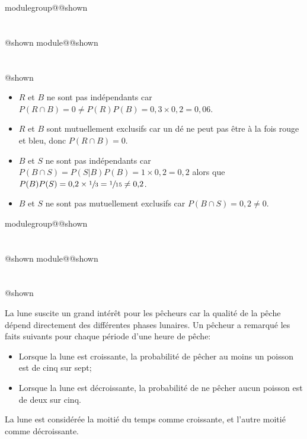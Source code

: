 \documentclass{Evaluation}
\makeatletter
\newcommand{\currentmodulekey}{}
\newcommand{\currentmoduletitle}{}
\newcommand{\currentgroupkey}{}
\newcommand{\currentgrouptitle}{}
\newcommand{\showmoduleifneeded}{%
  \ifx\currentgroupkey\empty\else
    \expandafter\ifx\csname modulegroup@\currentgroupkey @shown\endcsname\relax
      \section*{\currentgrouptitle}%
      \expandafter\gdef\csname modulegroup@\currentgroupkey @shown\endcsname{1}%
    \fi
  \fi
  \expandafter\ifx\csname module@\currentmodulekey @shown\endcsname\relax
    \section*{\currentmoduletitle}%
    \expandafter\gdef\csname module@\currentmodulekey @shown\endcsname{1}%
  \fi
}
\newenvironment{A23}{\showmoduleifneeded}{}
\newenvironment{H26r}{\showmoduleifneeded}{}
\makeatother
\begin{document}
\begin{questions}
\begin{H26r}
\begin{parts}
\begin{solution}
    \begin{itemize}
        \item $R$ et $B$ ne sont pas indépendants car $P(R \cap B)=0 \neq P(R)P(B)=0{,}3\times0{,}2=0{,}06$.
        \item $R$ et $B$ sont mutuellement exclusifs car un dé ne peut pas être à la fois rouge et bleu, donc $P(R \cap B)=0$.
        \item $B$ et $S$ ne sont pas indépendants car $P(B \cap S)=P(S|B)P(B)=1\times 0{,}2=0{,}2$ alors que $P(B)P(S)=0{,}2\times\sfrac{1}{3}=\sfrac{1}{15}\neq 0{,}2$.
        \item $B$ et $S$ ne sont pas mutuellement exclusifs car $P(B \cap S)=0{,}2\neq 0$.
    \end{itemize}
\end{solution}

\end{parts}
\end{H26r}

\begin{A23}
\question {} %
La lune suscite un grand intérêt pour les pêcheurs car la qualité de la pêche dépend directement des différentes phases lunaires. Un pêcheur a remarqué les faits suivants pour chaque période d'une heure de pêche:

\begin{itemize}
    \item Lorsque la lune est croissante, la probabilité de pêcher au moins un poisson est de cinq sur sept;
    \item Lorsque la lune est décroissante, la probabilité de ne pêcher aucun poisson est de deux sur cinq.
\end{itemize}
La lune est considérée la moitié du temps comme croissante, et l'autre moitié comme décroissante.

\end{A23}
\end{questions}
\end{document}

